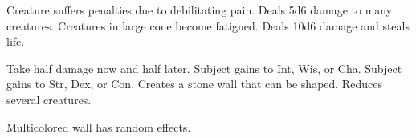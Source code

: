 \begin{swspelllist}
     Creature suffers penalties due to debilitating pain.
     Deals 5d6 damage to many creatures.
     Creatures in large cone become fatigued.
     Deals 10d6 damage and steals life.

     Take half damage now and half later. 
     Subject gains  to Int, Wis, or Cha.
     Subject gains  to Str, Dex, or Con.
     Creates a stone wall that can be shaped.
     Reduces several creatures.

     Multicolored wall has random effects.
\end{swspelllist}

